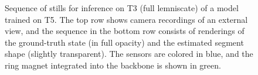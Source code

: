 \begin{figure}[hbt]
  \hfill
  \hfill
  \caption{Sequence of stills for inference on T3 (full lemniscate) of a model trained on T5. The top row shows camera recordings of an external view, and the sequence in the bottom row consists of renderings of the ground-truth state (in full opacity) and the estimated segment shape (slightly transparent). The sensors are colored in blue, and the ring magnet integrated into the backbone is shown in green.}
  \label{fig:promasens:experiment_sequences}
\end{figure}



